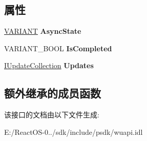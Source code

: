 \subsection*{属性}
\begin{DoxyCompactItemize}
\item 
\mbox{\label{interface_w_u_api_lib_1_1_i_installation_job_a4d08164b4caf4d6cc2439e1e2f90b7fa}} 
\hyperlink{structtag_v_a_r_i_a_n_t}{V\+A\+R\+I\+A\+NT} {\bfseries Async\+State}
\item 
\mbox{\label{interface_w_u_api_lib_1_1_i_installation_job_aa5914ec808a568158375035e29c905fe}} 
V\+A\+R\+I\+A\+N\+T\+\_\+\+B\+O\+OL {\bfseries Is\+Completed}
\item 
\mbox{\label{interface_w_u_api_lib_1_1_i_installation_job_a3c9157b90a344c3178cc3b2ec6e95adc}} 
\hyperlink{interface_w_u_api_lib_1_1_i_update_collection}{I\+Update\+Collection} {\bfseries Updates}
\end{DoxyCompactItemize}
\subsection*{额外继承的成员函数}


该接口的文档由以下文件生成\+:\begin{DoxyCompactItemize}
\item 
E\+:/\+React\+O\+S-\/0../sdk/include/psdk/wuapi.\+idl\end{DoxyCompactItemize}
